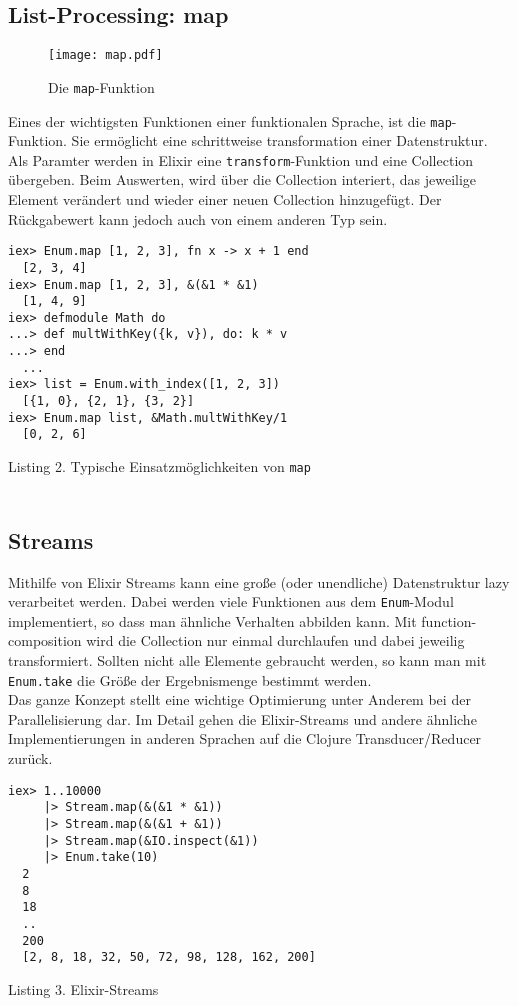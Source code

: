 \documentclass[10pt,journal,compsoc]{IEEEtran}
\begin{document}
\subsection{List-Processing: map}

\begin{figure}[!h]
\centering
\texttt{[image: map.pdf]}
\caption{Die \texttt{map}-Funktion}
\label{fig_map}
\end{figure}
Eines der wichtigsten Funktionen einer funktionalen Sprache, ist die \texttt{map}-Funktion. Sie ermöglicht eine schrittweise transformation einer Datenstruktur. Als Paramter werden in Elixir eine \texttt{transform}-Funktion und eine Collection übergeben. Beim Auswerten, wird über die Collection interiert, das jeweilige Element verändert und wieder einer neuen Collection hinzugefügt. Der Rückgabewert kann jedoch auch von einem anderen Typ sein.
\\
\begin{lstlisting}
iex> Enum.map [1, 2, 3], fn x -> x + 1 end
  [2, 3, 4]
iex> Enum.map [1, 2, 3], &(&1 * &1)
  [1, 4, 9]
iex> defmodule Math do
...> def multWithKey({k, v}), do: k * v
...> end
  ...
iex> list = Enum.with_index([1, 2, 3])
  [{1, 0}, {2, 1}, {3, 2}]
iex> Enum.map list, &Math.multWithKey/1
  [0, 2, 6]
\end{lstlisting}
\small{Listing 2. Typische Einsatzmöglichkeiten von \texttt{map}}\\
~\\

\subsection{Streams}
 Mithilfe von Elixir Streams kann eine große (oder unendliche) Datenstruktur lazy verarbeitet werden. Dabei werden viele Funktionen aus dem \texttt{Enum}-Modul implementiert, so dass man ähnliche Verhalten abbilden kann. Mit function-composition wird die Collection nur einmal durchlaufen und dabei jeweilig transformiert. Sollten nicht alle Elemente gebraucht werden, so kann man mit \texttt{Enum.take} die Größe der Ergebnismenge bestimmt werden.\\
Das ganze Konzept stellt eine wichtige Optimierung unter Anderem bei der Parallelisierung dar. Im Detail gehen die Elixir-Streams und andere ähnliche Implementierungen in anderen Sprachen auf die Clojure Transducer/Reducer zurück.
\begin{lstlisting}
iex> 1..10000
     |> Stream.map(&(&1 * &1))
     |> Stream.map(&(&1 + &1))
     |> Stream.map(&IO.inspect(&1))
     |> Enum.take(10)
  2
  8
  18
  ..
  200
  [2, 8, 18, 32, 50, 72, 98, 128, 162, 200]
\end{lstlisting}
\small{Listing 3. Elixir-Streams}\\
~\\
\end{document}
